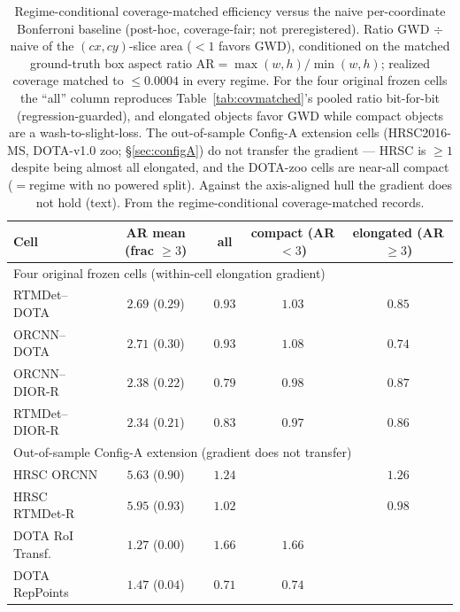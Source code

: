 \documentclass[11pt]{article}
\begin{document}
\begin{table}[t]\centering\small
\caption{Regime-conditional coverage-matched efficiency versus the naive per-coordinate
Bonferroni baseline (post-hoc, coverage-fair; not preregistered). Ratio GWD $\div$ naive of the
$(cx,cy)$-slice area (${<}1$ favors GWD), conditioned on the matched ground-truth box aspect ratio
$\mathrm{AR}=\max(w,h)/\min(w,h)$; realized coverage matched to $\le 0.0004$ in every regime.
For the four original frozen cells the ``all'' column reproduces Table~\ref{tab:covmatched}'s pooled
ratio bit-for-bit (regression-guarded), and elongated objects favor GWD while compact objects are a
wash-to-slight-loss. The out-of-sample Config-A extension cells (HRSC2016-MS, DOTA-v1.0 zoo;
\S\ref{sec:configA}) do not transfer the gradient --- HRSC is $\ge1$ despite being almost all elongated,
and the DOTA-zoo cells are near-all compact (\textemdash{}$=$regime with no powered split). Against the
axis-aligned hull the gradient does not hold (text). From the regime-conditional coverage-matched
records.}\label{tab:regime}
\begin{tabular}{lcccc}
\toprule
Cell & AR mean (frac ${\ge}3$) & all & compact (AR${<}3$) & elongated (AR${\ge}3$) \\
\midrule
\multicolumn{5}{l}{Four original frozen cells (within-cell elongation gradient)} \\
RTMDet--DOTA   & $2.69$ ($0.29$) & $0.93$ & $1.03$ & $0.85$ \\
ORCNN--DOTA    & $2.71$ ($0.30$) & $0.93$ & $1.08$ & $0.74$ \\
ORCNN--DIOR-R  & $2.38$ ($0.22$) & $0.79$ & $0.98$ & $0.87$ \\
RTMDet--DIOR-R & $2.34$ ($0.21$) & $0.83$ & $0.97$ & $0.86$ \\
\midrule
\multicolumn{5}{l}{Out-of-sample Config-A extension (gradient does not transfer)} \\
HRSC ORCNN         & $5.63$ ($0.90$) & $1.24$ & \textemdash{} & $1.26$ \\
HRSC RTMDet-R      & $5.95$ ($0.93$) & $1.02$ & \textemdash{} & $0.98$ \\
DOTA RoI Transf.   & $1.27$ ($0.00$) & $1.66$ & $1.66$ & \textemdash{} \\
DOTA RepPoints     & $1.47$ ($0.04$) & $0.71$ & $0.74$ & \textemdash{} \\
\bottomrule
\end{tabular}
\end{table}
\end{document}
